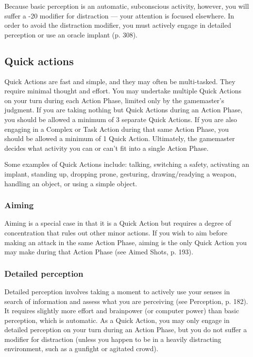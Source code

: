 Because basic perception is an automatic, subconscious activity, however, you will suffer a -20 modifier for distraction --- your attention is focused elsewhere. In order to avoid the distraction modifier, you must actively engage in detailed perception or use an oracle implant (p. 308).


\subsection{Quick actions}
\label{sec:combat-quick-actions}

Quick Actions are fast and simple, and they may often be multi-tasked. They require minimal thought and effort. You may undertake multiple Quick Actions on your turn during each Action Phase, limited only by the gamemaster’s judgment. If you are taking nothing but Quick Actions during an Action Phase, you should be allowed a minimum of 3 separate Quick Actions. If you are also engaging in a Complex or Task Action during that same Action Phase, you should be allowed a minimum of 1 Quick Action. Ultimately, the gamemaster decides what activity you can or can’t fit into a single Action Phase.

Some examples of Quick Actions include: talking, switching a safety, activating an implant, standing up, dropping prone, gesturing, drawing/readying a weapon, handling an object, or using a simple object.


\subsubsection{Aiming}

Aiming is a special case in that it is a Quick Action but requires a degree of concentration that rules out other minor actions. If you wish to aim before making an attack in the same Action Phase, aiming is the only Quick Action you may make during that Action Phase (see Aimed Shots, p. 193).

\subsubsection{Detailed perception}

Detailed perception involves taking a moment to actively use your senses in search of information and assess what you are perceiving (see Perception, p. 182). It requires slightly more effort and brainpower (or computer power) than basic perception, which is automatic. As a Quick Action, you may only engage in detailed perception on your turn during an Action Phase, but you do not suffer a modifier for distraction (unless you happen to be in a heavily distracting environment, such as a gunfight or agitated crowd).


